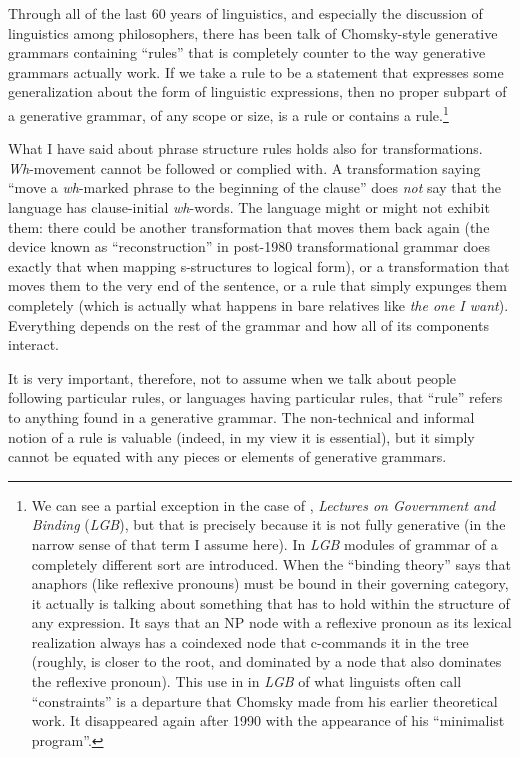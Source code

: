\documentclass[output=paper]{langscibook}
\begin{document}
Through all of the last 60 years of linguistics, and especially the discussion of linguistics among philosophers, there has been talk of Chomsky-style generative grammars containing ``rules'' that is completely counter to the way generative grammars actually work. If we take a rule to be a statement that expresses some generalization about the form of linguistic expressions, then no proper subpart of a generative grammar, of any scope or size, is a rule or contains a rule.\footnote{We can see a partial exception in the case of \citet{Chomsky81}, \textit{Lectures on Government and Binding} (\textit{LGB}), but that is precisely because it is not fully generative (in the narrow sense of that term I assume here). In \textit{LGB} modules of grammar of a completely different sort are introduced. When the ``binding theory'' says that anaphors (like reflexive pronouns) must be bound in their governing category, it actually is talking about something that has to hold within the structure of any expression. It says that an NP node with a reflexive pronoun as its lexical realization always has a coindexed node that c-commands it in the tree (roughly, is closer to the root, and dominated by a node that also dominates the reflexive pronoun).  This use in in \textit{LGB} of what linguists often call ``constraints'' is a departure that Chomsky made from his earlier theoretical work. It disappeared again after 1990 with the appearance of his ``minimalist program''.}

What I have said about phrase structure rules holds also for transformations. \textit{Wh}-movement cannot be followed or complied with. A transformation saying ``move a \textit{wh}-marked phrase to the beginning of the clause'' does \emph{not} say that the language has clause-initial \textit{wh}-words. The language might or might not exhibit them: there could be another transformation that moves them back again (the device known as ``reconstruction'' in post-1980 transformational grammar does exactly that when mapping s-structures to logical form), or a transformation that moves them to the very end of the sentence, or a rule that simply expunges them completely (which is actually what happens in bare relatives like \textit{the one I want}). Everything depends on the rest of the grammar and how all of its components interact.

It is very important, therefore, not to assume when we talk about people following particular rules, or languages having particular rules, that ``rule'' refers to anything found in a generative grammar. The non-technical and informal notion of a rule is valuable (indeed, in my view it is essential), but it simply cannot be equated with any pieces or elements of generative grammars.
\end{document}
